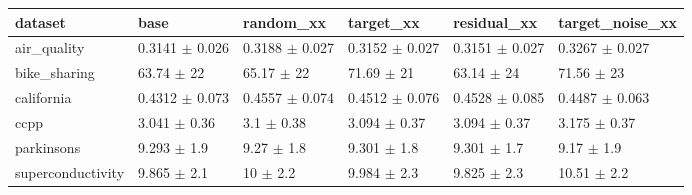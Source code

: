 \begin{tabular}{llllll}
\toprule
dataset & base & random\_xx & target\_xx & residual\_xx & target\_noise\_xx \\
\midrule
air\_quality & 0.3141 $\pm$ 0.026 & 0.3188 $\pm$ 0.027 & 0.3152 $\pm$ 0.027 & 0.3151 $\pm$ 0.027 & 0.3267 $\pm$ 0.027 \\
bike\_sharing & 63.74 $\pm$ 22 & 65.17 $\pm$ 22 & 71.69 $\pm$ 21 & 63.14 $\pm$ 24 & 71.56 $\pm$ 23 \\
california & 0.4312 $\pm$ 0.073 & 0.4557 $\pm$ 0.074 & 0.4512 $\pm$ 0.076 & 0.4528 $\pm$ 0.085 & 0.4487 $\pm$ 0.063 \\
ccpp & 3.041 $\pm$ 0.36 & 3.1 $\pm$ 0.38 & 3.094 $\pm$ 0.37 & 3.094 $\pm$ 0.37 & 3.175 $\pm$ 0.37 \\
parkinsons & 9.293 $\pm$ 1.9 & 9.27 $\pm$ 1.8 & 9.301 $\pm$ 1.8 & 9.301 $\pm$ 1.7 & 9.17 $\pm$ 1.9 \\
superconductivity & 9.865 $\pm$ 2.1 & 10 $\pm$ 2.2 & 9.984 $\pm$ 2.3 & 9.825 $\pm$ 2.3 & 10.51 $\pm$ 2.2 \\
\bottomrule
\end{tabular}
